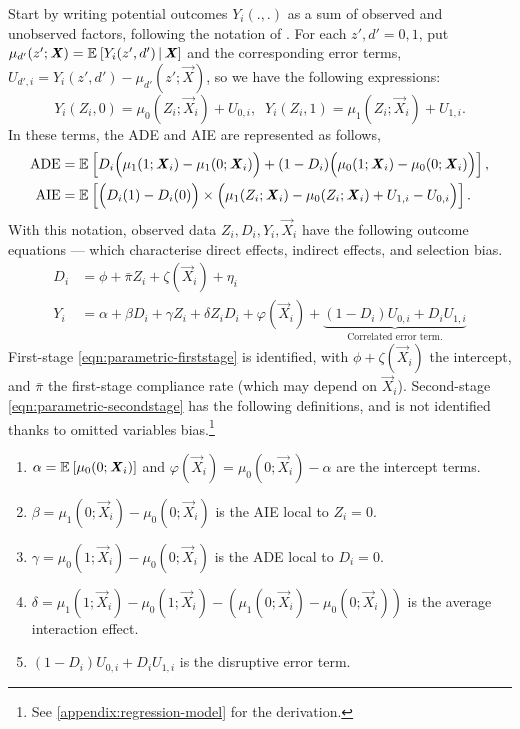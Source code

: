 Start by writing potential outcomes $Y_i(., .)$ as a sum of observed and unobserved factors, following the notation of \cite{heckman2005structural}.
For each $z',d' = 0,1$, put $\mu_{d'}(z'; \boldsymbol{\mathit{X}}) = \mathbb{E}_{} \left[ Y_i(z', d') \, \middle\vert \, \boldsymbol{\mathit{X}} \right]$ and the corresponding error terms, $U_{d', i} = Y_i(z', d') - \mu_{d'}(z'; \vec X)$, so we have the following expressions:
\[ Y_i(Z_i, 0)
        = \mu_{0}(Z_i; \vec X_i) + U_{0,i}, \;\;
    Y_i(Z_i, 1)
        = \mu_{1}(Z_i; \vec X_i) + U_{1,i}. \]
In these terms, the ADE and AIE are represented as follows,
\begin{align*}
    \text{ADE}
    &= \mathbb{E}_{} \left[  D_i \Big( \mu_{1}(1; \boldsymbol{\mathit{X}}_i) - \mu_{1}(0; \boldsymbol{\mathit{X}}_i)\Big)
        + (1 - D_i) \Big( \mu_{0}(1; \boldsymbol{\mathit{X}}_i) - \mu_{0}(0; \boldsymbol{\mathit{X}}_i)\Big) \right], \\
    \text{AIE}
        &= \mathbb{E}_{} \left[ \Big( D_i(1) - D_i(0) \Big)
        \times \Big( \mu_1(Z_i; \boldsymbol{\mathit{X}}_i) - \mu_0(Z_i; \boldsymbol{\mathit{X}}_i) + U_{1,i} - U_{0,i}\Big)  \right].
\end{align*}
With this notation, observed data $Z_i, D_i, Y_i, \vec X_i$ have the following outcome equations --- which characterise direct effects, indirect effects, and selection bias.
\begin{align}
    \label{eqn:parametric-firststage}
    D_i &= \phi + \bar \pi Z_i + \zeta(\vec X_i) + \eta_i  \\
    \label{eqn:parametric-secondstage}
    Y_i &= \alpha + \beta D_i + \gamma Z_i + \delta Z_i D_i
    + \varphi(\vec X_i)
    + \underbrace{\left(1 - D_i \right)U_{0,i} + D_i U_{1,i}}_{
        \text{Correlated error term.}}
\end{align}
First-stage \eqref{eqn:parametric-firststage} is identified, with $\phi + \zeta(\vec X_i)$ the intercept, and $\bar \pi$ the first-stage compliance rate (which may depend on $\vec X_i$).
Second-stage \eqref{eqn:parametric-secondstage} has the following definitions, and is not identified thanks to omitted variables bias.\footnote{
    See \autoref{appendix:regression-model} for the derivation.
}
\begin{enumerate}[label=\textbf{(\alph*)}]
    \item $\alpha = \mathbb{E}_{} \left[ \mu_0(0; \boldsymbol{\mathit{X}}_i) \right]$ and $\varphi(\vec X_i) = \mu_0(0; \vec X_i) - \alpha$ are the intercept terms.
    \item $\beta = \mu_1(0; \vec X_i) - \mu_0(0; \vec X_i)$ is the AIE local to $Z_i = 0$.
    \item $\gamma = \mu_0(1; \vec X_i) - \mu_0(0; \vec X_i)$ is the ADE local to $D_i = 0$.
    \item $\delta = \mu_1(1; \vec X_i) - \mu_0(1; \vec X_i)- \left( \mu_1(0; \vec X_i) - \mu_0(0; \vec X_i) \right)$ is the average interaction effect.
    \item $\left( 1 - D_i \right) U_{0,i} + D_i U_{1,i}$ is the disruptive error term.
\end{enumerate}

